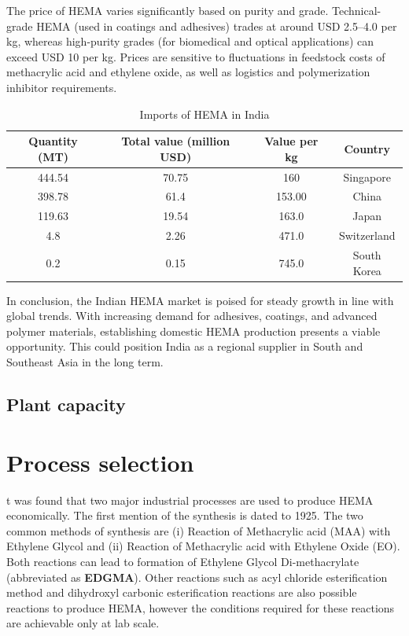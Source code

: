 \documentclass[12pt,a4paper]{report}
\begin{document}
The price of HEMA varies significantly based on purity and grade. Technical-grade HEMA (used in coatings and adhesives) trades at around USD 2.5–4.0 per kg, whereas high-purity grades (for biomedical and optical applications) can exceed USD 10 per kg. Prices are sensitive to fluctuations in feedstock costs of methacrylic acid and ethylene oxide, as well as logistics and polymerization inhibitor requirements.

\begin{table}[h]
	\centering
	\caption{Imports of HEMA in India}
	\label{tab::hysteresis}
	
	\begin{tabular}{|c|c|c|c|}
		\hline
		\rule[-1ex]{0pt}{2.5ex} Quantity (MT) & Total value (million USD) & Value per kg & Country \\
		\hline
		\rule[-1ex]{0pt}{2.5ex} 444.54 & 70.75 & 160 & Singapore \\
		\hline
		\rule[-1ex]{0pt}{2.5ex} 398.78 & 61.4 & 153.00 & China \\
		\hline
		\rule[-1ex]{0pt}{2.5ex} 119.63 & 19.54 & 163.0 & Japan \\
		\hline
		\rule[-1ex]{0pt}{2.5ex} 4.8 & 2.26 & 471.0 & Switzerland \\
		\hline
		\rule[-1ex]{0pt}{2.5ex} 0.2 & 0.15 & 745.0 & South Korea \\
		\hline
	\end{tabular}
	
\end{table}


In conclusion, the Indian HEMA market is poised for steady growth in line with global trends. With increasing demand for adhesives, coatings, and advanced polymer materials, establishing domestic HEMA production presents a viable opportunity. This could position India as a regional supplier in South and Southeast Asia in the long term.


\section{Plant capacity}

\chapter{Process selection}
t was found that two major industrial processes are used to produce HEMA economically. The first mention of the synthesis is dated to 1925. The two common methods of synthesis are (i) Reaction of Methacrylic acid (MAA) with Ethylene Glycol and (ii) Reaction of Methacrylic acid with Ethylene Oxide (EO). Both reactions can lead to formation of Ethylene Glycol Di-methacrylate (abbreviated as \textbf{EDGMA}). Other reactions such as acyl chloride esterification method and dihydroxyl carbonic esterification reactions are also possible reactions to produce HEMA, however the conditions required for these reactions are achievable only at lab scale.
\end{document}
